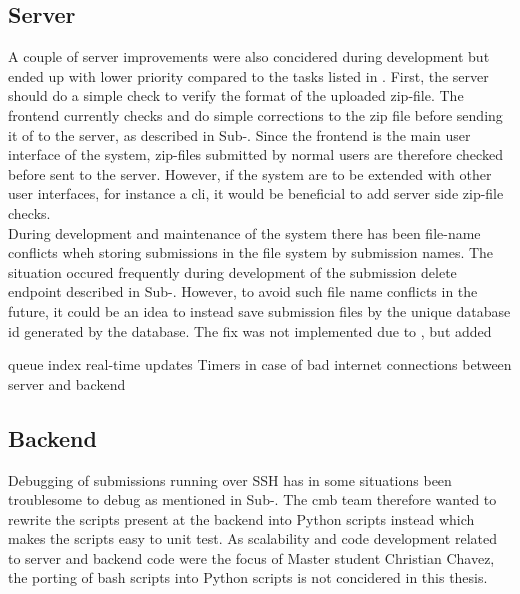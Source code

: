 \subsection{Server}
A couple of server improvements were also concidered during development but ended up with lower priority compared to the tasks listed in . First, the server should do a simple check to verify the format of the uploaded zip-file. The frontend currently checks and do simple corrections to the zip file before sending it of to the server, as described in Sub-. Since the frontend is the main user interface of the system, zip-files submitted by normal users are therefore checked before sent to the server. However, if the system are to be extended with other user interfaces, for instance a \gls{cli}, it would be beneficial to add server side zip-file checks. \\

During development and maintenance of the system there has been file-name conflicts wheh storing submissions in the file system by submission names. The situation occured frequently during development of the submission delete endpoint described in Sub-. However, to avoid such file name conflicts in the future, it could be an idea to instead save submission files by the unique database id generated by the database. The fix was not implemented due to , but added

queue index real-time updates
Timers in case of bad internet connections between server and backend

\subsection{Backend}
Debugging of submissions running over SSH has in some situations been troublesome to debug as mentioned in Sub-. The \gls{cmb} team therefore wanted to rewrite the scripts present at the backend into Python scripts instead which makes the scripts easy to unit test. As scalability and code development related to server and backend code were the focus of Master student Christian Chavez, the porting of bash scripts into Python scripts is not concidered in this thesis. 

